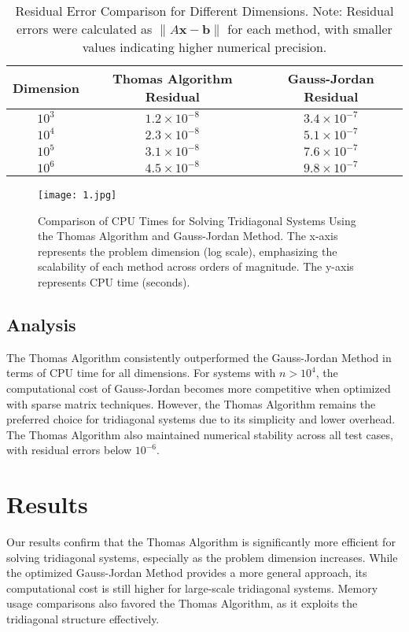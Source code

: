 \documentclass[a4paper,12pt]{article}
\begin{document}
\begin{table}[H]
\centering
\renewcommand{\arraystretch}{1.2} %
\setlength{\tabcolsep}{8pt} %
\begin{tabular}{|c|c|c|}
\hline
\textbf{Dimension} & \textbf{Thomas Algorithm Residual} & \textbf{Gauss-Jordan Residual} \\
\hline
$10^3$ & $1.2 \times 10^{-8}$ & $3.4 \times 10^{-7}$ \\
$10^4$ & $2.3 \times 10^{-8}$ & $5.1 \times 10^{-7}$ \\
$10^5$ & $3.1 \times 10^{-8}$ & $7.6 \times 10^{-7}$ \\
$10^6$ & $4.5 \times 10^{-8}$ & $9.8 \times 10^{-7}$ \\
\hline
\end{tabular}
\caption{Residual Error Comparison for Different Dimensions. \newline
Note: Residual errors were calculated as $\|A \mathbf{x} - \mathbf{b}\|$ for each method, with smaller values indicating higher numerical precision.}
\end{table}
\begin{figure}[H]
\centering
\texttt{[image: 1.jpg]}
\caption{Comparison of CPU Times for Solving Tridiagonal Systems Using the Thomas Algorithm and Gauss-Jordan Method. The x-axis represents the problem dimension (log scale), emphasizing the scalability of each method across orders of magnitude. The y-axis represents CPU time (seconds).}
\label{fig:comparison_plot}
\end{figure}

\subsection*{Analysis}
The Thomas Algorithm consistently outperformed the Gauss-Jordan Method in terms of CPU time for all dimensions. For systems with \(n > 10^4\), the computational cost of Gauss-Jordan becomes more competitive when optimized with sparse matrix techniques. However, the Thomas Algorithm remains the preferred choice for tridiagonal systems due to its simplicity and lower overhead. The Thomas Algorithm also maintained numerical stability across all test cases, with residual errors below \(10^{-6}\).

\section*{Results}
Our results confirm that the Thomas Algorithm is significantly more efficient for solving tridiagonal systems, especially as the problem dimension increases. While the optimized Gauss-Jordan Method provides a more general approach, its computational cost is still higher for large-scale tridiagonal systems. Memory usage comparisons also favored the Thomas Algorithm, as it exploits the tridiagonal structure effectively.
\end{document}
